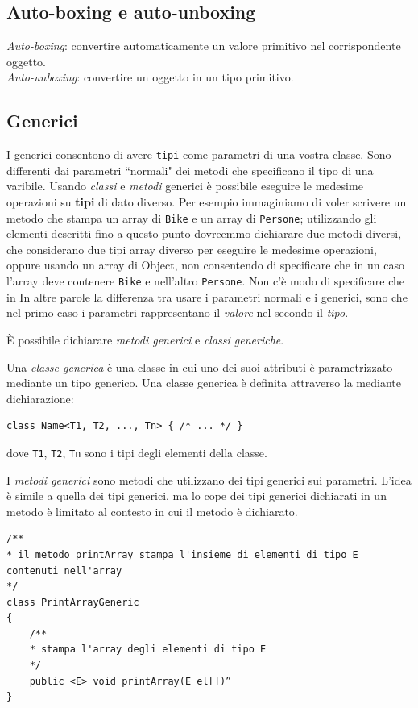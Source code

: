\documentclass{article}
\begin{document}
\subsection{Auto-boxing e auto-unboxing}
\emph{Auto-boxing}: convertire automaticamente un valore primitivo nel corrispondente oggetto.\\
\emph{Auto-unboxing}: convertire un oggetto in un tipo primitivo.

\subsection{Generici}
I generici consentono di avere \texttt{tipi} come parametri di una vostra classe. Sono differenti dai parametri ``normali" dei metodi che specificano il tipo di una varibile. Usando \emph{classi} e \emph{metodi} generici \`e possibile eseguire le medesime operazioni su \textbf{tipi} di dato diverso. Per esempio immaginiamo di voler scrivere un metodo che stampa un array di \texttt{Bike} e un array di \texttt{Persone}; utilizzando gli elementi descritti fino a questo punto dovreemmo dichiarare due metodi diversi, che considerano due tipi array diverso per eseguire le medesime operazioni, oppure usando un array di Object, non consentendo di specificare che in un caso l'array deve contenere \texttt{Bike} e nell'altro \texttt{Persone}. Non c'\`e modo di specificare che in In altre parole la differenza tra usare i parametri normali e i generici, sono che nel primo caso i parametri rappresentano il \emph{valore} nel secondo il \emph{tipo}.

\`E possibile dichiarare \emph{metodi generici} e \emph{classi generiche}.

Una \emph{classe generica} \`e una classe in cui uno dei suoi attributi \`e parametrizzato mediante un tipo generico. Una classe generica \`e definita attraverso la mediante dichiarazione:

\begin{lstlisting}
class Name<T1, T2, ..., Tn> { /* ... */ }
\end{lstlisting}

dove \texttt{T1}, \texttt{T2}, \texttt{Tn} sono i tipi degli elementi della classe.

I \emph{metodi generici} sono metodi che utilizzano dei tipi generici sui parametri. L'idea \`e simile a quella dei tipi generici, ma lo cope dei tipi generici dichiarati in un metodo \`e limitato al contesto in cui il metodo \`e dichiarato. 

\begin{lstlisting}
/**
* il metodo printArray stampa l'insieme di elementi di tipo E contenuti nell'array
*/
class PrintArrayGeneric
{
    /**
    * stampa l'array degli elementi di tipo E
    */
    public <E> void printArray(E el[])”
}
\end{lstlisting}
\end{document}
